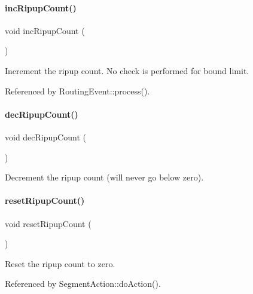 \paragraph{\texorpdfstring{inc\+Ripup\+Count()}{incRipupCount()}}
{\footnotesize\ttfamily void inc\+Ripup\+Count (\begin{DoxyParamCaption}{ }\end{DoxyParamCaption})\hspace{0.3cm}{\ttfamily [inline]}}

Increment the ripup count. No check is performed for bound limit. 

Referenced by Routing\+Event\+::process().

\mbox{\label{classKite_1_1DataNegociate_a4f94572b3541ea2d150c75bedc8364ed}} 
\paragraph{\texorpdfstring{dec\+Ripup\+Count()}{decRipupCount()}}
{\footnotesize\ttfamily void dec\+Ripup\+Count (\begin{DoxyParamCaption}{ }\end{DoxyParamCaption})\hspace{0.3cm}{\ttfamily [inline]}}

Decrement the ripup count (will never go below zero). \mbox{\label{classKite_1_1DataNegociate_a00a11ad9089d2df7b290615921e0c96a}} 
\paragraph{\texorpdfstring{reset\+Ripup\+Count()}{resetRipupCount()}}
{\footnotesize\ttfamily void reset\+Ripup\+Count (\begin{DoxyParamCaption}{ }\end{DoxyParamCaption})\hspace{0.3cm}{\ttfamily [inline]}}

Reset the ripup count to zero. 

Referenced by Segment\+Action\+::do\+Action().


